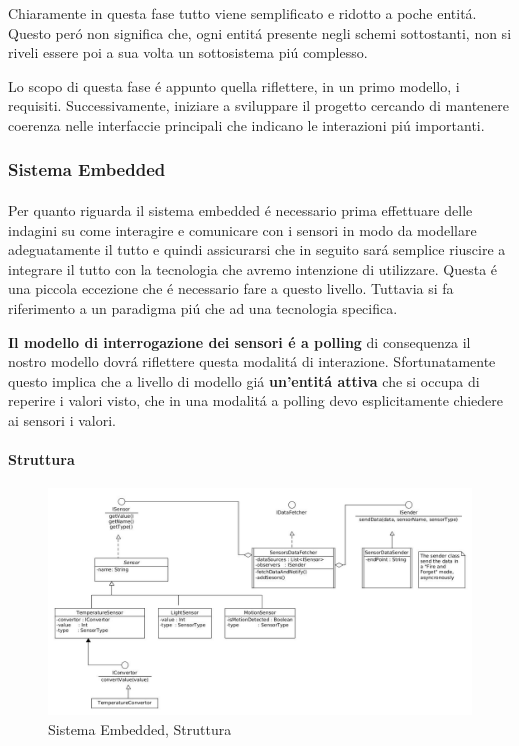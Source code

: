 Chiaramente in questa fase tutto viene semplificato e ridotto a poche entit\'a. Questo per\'o non significa che, ogni entit\'a presente negli schemi sottostanti, non si riveli essere poi a sua volta un sottosistema pi\'u complesso.

Lo scopo di questa fase \'e appunto quella riflettere, in un primo modello, i requisiti. Successivamente, iniziare a sviluppare il progetto cercando di mantenere coerenza nelle interfaccie principali che indicano le interazioni pi\'u importanti.

\subsubsection{Sistema Embedded}

\paragraph{}Per quanto riguarda il sistema embedded \'e necessario prima effettuare delle indagini su come interagire e comunicare con i sensori in modo da modellare adeguatamente il tutto e quindi assicurarsi che in seguito sar\'a semplice riuscire a integrare il tutto con la tecnologia che avremo intenzione di utilizzare. Questa \'e una piccola eccezione che \'e necessario fare a questo livello. Tuttavia si fa riferimento a un paradigma pi\'u che ad una tecnologia specifica.

\textbf{Il modello di interrogazione dei sensori \'e a polling} di consequenza il nostro modello dovr\'a riflettere questa modalit\'a di interazione. Sfortunatamente questo implica che a livello di modello gi\'a \textbf{un'entit\'a attiva} che si occupa di reperire i valori visto, che in una modalit\'a a polling devo esplicitamente chiedere ai sensori i valori.

\paragraph{Struttura}

\begin{figure}[h]
\centering
\includegraphics[width=\textwidth]{Figures/DomainModel/EmbeddedSystem/Structure}
\caption{Sistema Embedded, Struttura}
\end{figure}

